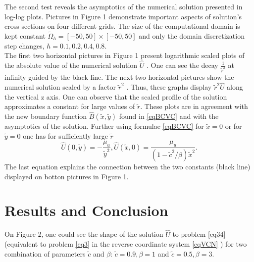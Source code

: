 \documentclass[12pt]{article}
\theoremstyle{theorem}
\theoremstyle{defi}
\begin{document}
The second test reveals the asymptotics of the numerical solution presented in log-log plots. Pictures in Figure 1 demonstrate important aspects of solution's cross sections on four different grids. The size of the computational domain is kept constant  $\tilde \Omega_h = [-50, 50]\times[-50, 50]$ and only the domain discretization step changes, $h = 0.1, 0.2, 0.4, 0.8$. 
\\


The first two horizontal pictures in Figure 1 present logarithmic scaled plots of the absolute value of the numerical solution $\widehat{U}$  . One can see the decay $\frac{1}{\tilde r^2}$  at infinity guided by the black line. The next two horizontal pictures show the numerical solution scaled by a factor $\tilde r^2$  . Thus, these graphs display  $\tilde r^2\widehat{U}$  along the vertical z axis. One can observe that the scaled profile of the solution approximates a constant for large values of $ \tilde r$.  These plots are in agreement with the new boundary function $\widehat B(\tilde{x} , \tilde y)$ found in \eqref{eqBCVC} and with the asymptotics of the solution. Further using formulae \eqref{eqBCVC}  for $\tilde x = 0$ or for $\tilde y = 0$ one has for sufficiently large $ \tilde r $
$$
\widehat{U}(0,\tilde y) = - \frac{\mu_u}{\tilde y^2}, \widehat{U}(\tilde x,0) = \frac{\mu_u}{(1 - \tilde c^2/\beta )\tilde x^2}.
$$
The last equation explains the connection between the two constants (black line) displayed on botton pictures in Figure 1.


\section{Results and Conclusion}
On Figure 2, one could see the shape of the solution $\widehat U$ to problem  \eqref{eq34} (equivalent to problem \eqref{eq3} in the reverse coordinate system \eqref{eqVCN}  ) for two combination of parameters $\tilde  c$ and $\beta$:
$\tilde  c = 0.9, \beta = 1$ and $\tilde c = 0.5, \beta = 3$.
\end{document}
